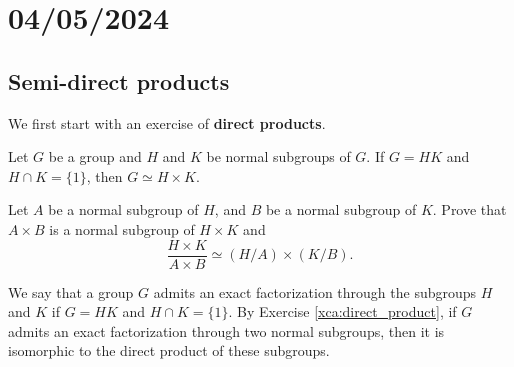 \section{04/05/2024}

\subsection{Semi-direct products}

We first start with an exercise of \textbf{direct products}.

\begin{exercise}
\label{xca:direct_product}
Let $G$ be a group and $H$ and $K$ be normal subgroups of $G$.
If $G=HK$ and $H\cap K=\{1\}$, then $G\simeq H\times K$.
\end{exercise}




\begin{exercise}
Let $A$ be a normal subgroup of $H$, and $B$ be a normal subgroup of $K$. 
Prove that $A\times B$ is a normal subgroup of
$H\times K$ and 
\[
\frac{H\times K}{A\times B}\simeq(H/A)\times(K/B).
\]
\end{exercise}

We say that a group $G$ admits an exact factorization through 
the subgroups $H$ and $K$ if $G=HK$ and 
$H\cap K=\{1\}$. By Exercise \ref{xca:direct_product}, 
if $G$ admits an exact factorization through two normal subgroups, then 
it is isomorphic to the direct product of these subgroups. 

